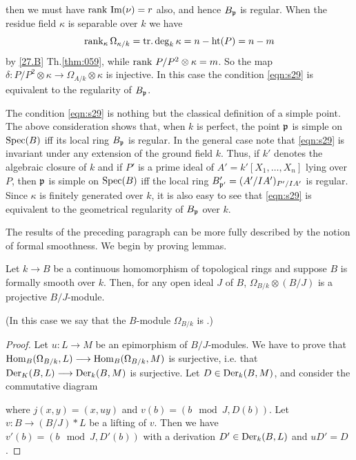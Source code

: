 \documentclass[../main]{subfiles}
\begin{document}
then we must have $\operatorname{rank} \, \operatorname{Im}(\nu) = r$ also, and hence $B_{\mathfrak{p}}$ is regular. When the residue field $\kappa$ is separable over $k$ we have 
\[
\operatorname{rank}_\kappa \Omega_{\kappa/k} = \operatorname{tr. deg}_k \kappa = n - \operatorname{ht}(P) = n - m
\]
by \ref{27.B} Th.\ref{thm:059}, while $\operatorname{rank} \, P/P^2 \otimes \kappa = m$. So the map $\delta : P/P^2 \otimes \kappa \longrightarrow \Omega_{A/k} \otimes \kappa$ is injective. In this case the condition \eqref{eqn:s29} is equivalent to the regularity of $B_{\mathfrak{p}}$. 

The condition \eqref{eqn:s29} is nothing but the classical definition of a simple point. The above consideration shows that, when $k$ is perfect, the point $\mathfrak{p}$ is simple on $\operatorname{Spec}(B)$ iff its local ring $B_{\mathfrak{p}}$ is regular. In the general case note that \eqref{eqn:s29} is invariant under any extension of the ground field $k$. Thus, if $k'$ denotes the algebraic closure of $k$ and if $P'$ is a prime ideal of $A' = k'[X_1, \ldots, X_n]$ lying over $P$, then $\mathfrak{p}$ is simple on $\operatorname{Spec}(B)$ iff the local ring $B'_{\mathfrak{p}'} = (A'/IA')_{P'/IA'}$ is regular. Since $\kappa$ is finitely generated over $k$, it is also easy to see that \eqref{eqn:s29} is equivalent to the geometrical regularity of $B_{\mathfrak{p}}$ over $k$. 

\newparagraph The results of the preceding paragraph can be more fully described by the notion of formal smoothness. We begin by proving lemmas. 

\begin{lemma}
\label{lem:29.1}
Let $k \longrightarrow B$ be a continuous homomorphism of topological rings and suppose $B$ is formally smooth over $k$. Then, for any open ideal $J$ of $B$, $\Omega_{B/k} \otimes (B/J)$ is a projective $B/J$-module. 
\end{lemma}

(In this case we say that the $B$-module $\Omega_{B/k}$ is .)

\begin{proof}
Let $u : L \longrightarrow M$ be an epimorphism of $B/J$-modules. We have to prove that $\operatorname{Hom}_B(\Omega_{B/k}, L) \longrightarrow \operatorname{Hom}_B(\Omega_{B/k}, M)$ is surjective, i.e. that $\operatorname{Der}_K(B, L) \longrightarrow \operatorname{Der}_k(B,M)$ is surjective. Let $D \in \operatorname{Der}_k(B,M)$, and consider the commutative diagram

\begin{center}
\end{center}

where $j(x,y) = (x, uy)$ and $v(b) = (b \mod J, D(b))$. Let $v : B \longrightarrow (B/J) \ast L$ be a lifting of $v$. Then we have $v'(b) = (b \mod J, D'(b))$ with a derivation $D' \in \operatorname{Der}_k(B, L)$ and $u D' = D$.
\end{proof}
\end{document}
